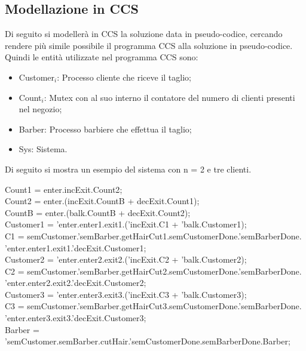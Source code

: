\subsection{Modellazione in CCS}

Di seguito si modellerà in CCS la soluzione data in pseudo-codice, cercando rendere più simile possibile il programma CCS alla soluzione in pseudo-codice.
Quindi le entità utilizzate nel programma CCS sono:
\begin{itemize}
	\item \textsf{Customer$_{i}$}: Processo cliente che riceve il taglio;
	\item \textsf{Count$_{i}$}: \textsf{Mutex} con al suo interno il contatore del numero di clienti presenti nel negozio;
	\item \textsf{Barber}: Processo barbiere che effettua il taglio;
	\item \textsf{Sys}: Sistema.
\end{itemize}

Di seguito si mostra un esempio del sistema con n = 2 e tre clienti.

\textsf{Count1 = enter.incExit.Count2};\\
\textsf{Count2 = enter.(incExit.CountB + decExit.Count1)};\\
\textsf{CountB = enter.(balk.CountB + decExit.Count2)};\\

\textsf{Customer1 = 'enter.enter1.exit1.('incExit.C1 + 'balk.Customer1)};\\
\textsf{C1 = semCustomer.'semBarber.getHairCut1.semCustomerDone.'semBarberDone.\\'enter.enter1.exit1.'decExit.Customer1};\\

\textsf{Customer2 = 'enter.enter2.exit2.('incExit.C2 + 'balk.Customer2)};\\
\textsf{C2 = semCustomer.'semBarber.getHairCut2.semCustomerDone.'semBarberDone.\\'enter.enter2.exit2.'decExit.Customer2};\\

\textsf{Customer3 = 'enter.enter3.exit3.('incExit.C3 + 'balk.Customer3)};\\
\textsf{C3 = semCustomer.'semBarber.getHairCut3.semCustomerDone.'semBarberDone.\\'enter.enter3.exit3.'decExit.Customer3};\\

\textsf{Barber = 'semCustomer.semBarber.cutHair.'semCustomerDone.semBarberDone.Barber};

